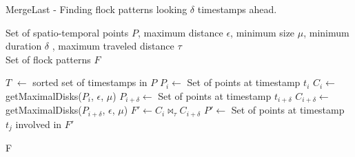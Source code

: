 \documentclass[12pt]{scrartcl}
\begin{document}
\renewcommand{\algorithmicrequire}{\textbf{Input:}}
\renewcommand{\algorithmicensure}{\textbf{Output:}}
\renewcommand{\algorithmicforall}{\textbf{for each}}

\begin{algorithm}
  \footnotesize
  \caption{MergeLast - Finding flock patterns looking $\delta$ timestamps ahead.}
  \label{alg:flockfindermergelast}
  \begin{algorithmic}
    \REQUIRE 
    Set of spatio-temporal points $P$, maximum distance $\epsilon$, minimum size $\mu$, minimum duration $\delta$ , maximum traveled distance $\tau$ \\

    \ENSURE 
    Set of flock patterns $F$ 
    
    $T$ $\leftarrow$ sorted set of timestamps in $P$
		\STATE $P_i \leftarrow$ Set of points at timestamp $t_i$
		\STATE $C_i \leftarrow$ getMaximalDisks($P_i$, $\epsilon$, $\mu$)
		\STATE $P_{i+\delta} \leftarrow$ Set of points at timestamp $t_{i+\delta}$
		\STATE $C_{i+\delta} \leftarrow$ getMaximalDisks($P_{i+\delta}$, $\epsilon$, $\mu$)
        	\STATE $F' \leftarrow C_i \Join_{\tau} C_{i+\delta}$  
				\STATE $P' \leftarrow $ Set of points at timestamp $t_j$ involved in $F'$ 
        	\ENDFOR
		\ENDIF
    \ENDFOR
	
	\RETURN F
  \end{algorithmic}
\end{algorithm}

\clearpage
\end{document}
